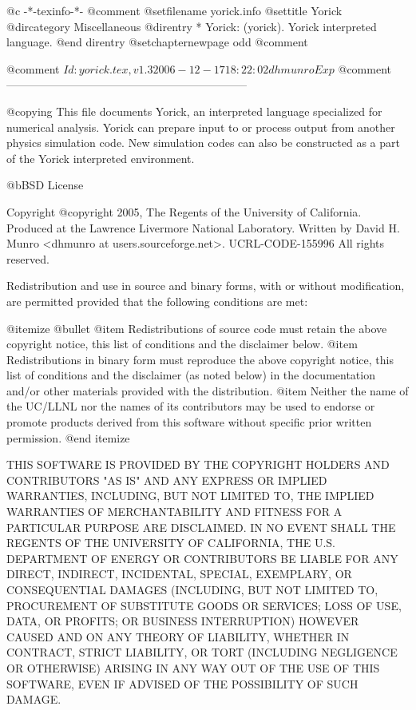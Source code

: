     @c -*-texinfo-*-
@comment %
@setfilename yorick.info
@settitle Yorick
@dircategory Miscellaneous
@direntry
* Yorick: (yorick).       Yorick interpreted language.
@end direntry
@setchapternewpage odd
@comment %

@comment $Id: yorick.tex,v 1.3 2006-12-17 18:22:02 dhmunro Exp $
@comment -----------------------------------------------------------------

@copying
This file documents Yorick, an interpreted language specialized for
numerical analysis.  Yorick can prepare input to or process output from
another physics simulation code.  New simulation codes can also be
constructed as a part of the Yorick interpreted environment.

@b{BSD License}

Copyright @copyright{} 2005, The Regents of the University of California.
Produced at the Lawrence Livermore National Laboratory.
Written by David H. Munro <dhmunro at users.sourceforge.net>.
UCRL-CODE-155996
All rights reserved.

Redistribution and use in source and binary forms, with or without
modification, are permitted provided that the following conditions are
met:

@itemize @bullet
@item
Redistributions of source code must retain the above copyright
notice, this list of conditions and the disclaimer below.
@item
Redistributions in binary form must reproduce the above copyright
notice, this list of conditions and the disclaimer (as noted below)
in the documentation and/or other materials provided with the
distribution.
@item
Neither the name of the UC/LLNL nor the names of its contributors
may be used to endorse or promote products derived from this software
without specific prior written permission.
@end itemize

THIS SOFTWARE IS PROVIDED BY THE COPYRIGHT HOLDERS AND CONTRIBUTORS
"AS IS" AND ANY EXPRESS OR IMPLIED WARRANTIES, INCLUDING, BUT NOT
LIMITED TO, THE IMPLIED WARRANTIES OF MERCHANTABILITY AND FITNESS FOR
A PARTICULAR PURPOSE ARE DISCLAIMED. IN NO EVENT SHALL THE REGENTS OF
THE UNIVERSITY OF CALIFORNIA, THE U.S. DEPARTMENT OF ENERGY OR
CONTRIBUTORS BE LIABLE FOR ANY DIRECT, INDIRECT, INCIDENTAL, SPECIAL,
EXEMPLARY, OR CONSEQUENTIAL DAMAGES (INCLUDING, BUT NOT LIMITED TO,
PROCUREMENT OF SUBSTITUTE GOODS OR SERVICES; LOSS OF USE, DATA, OR
PROFITS; OR BUSINESS INTERRUPTION) HOWEVER CAUSED AND ON ANY THEORY OF
LIABILITY, WHETHER IN CONTRACT, STRICT LIABILITY, OR TORT (INCLUDING
NEGLIGENCE OR OTHERWISE) ARISING IN ANY WAY OUT OF THE USE OF THIS
SOFTWARE, EVEN IF ADVISED OF THE POSSIBILITY OF SUCH DAMAGE.

